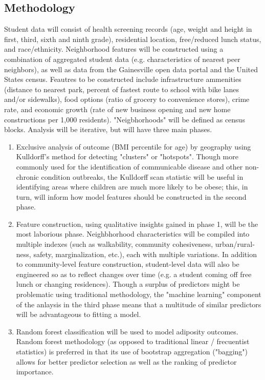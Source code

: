 \documentclass[11pt]{article}
\begin{document}
\subsection*{Methodology}
Student data will consist of health screening records (age, weight and height in first, third, sixth and ninth grade), residential location, free/reduced lunch status, and race/ethnicity.  Neighborhood features will be constructed using a combination of aggregated student data (e.g. characteristics of nearest peer neighbors), as well as data from the Gainesville open data portal and the United States census.  Feautres to be constructed include infrastructure ammenities (distance to nearest park, percent of fastest route to school with bike lanes and/or sidewalks), food options (ratio of grocery to convenience stores), crime rate, and economic growth (rate of new business opening and new home constructions per 1,000 residents).  "Neigbhorhoods" will be defined as census blocks. Analysis will be iterative, but will have three main phases.
\begin{enumerate}
\item Exclusive analysis of outcome (BMI percentile for age) by geography using Kulldorff's method for detecting "clusters" or "hotspots".\cite{Kulldorff1997} Though more commonly used for the identification of communicable disease and other non-chronic condition outbreaks, the Kulldorff scan statistic will be useful in identifying areas where children are much more likely to be obese; this, in turn, will inform how model features should be constructed in the second phase.
\item Feature construction, using qualitative insights gained in phase 1, will be the most laborious phase. Neighbhorhood characteristics will be compiled into multiple indexes (such as walkability, community cohesiveness, urban/rural-ness, safety, marginalization, etc.), each with multiple variations. In addition to community-level feature construction, student-level data will also be engineered so as to reflect changes over time (e.g. a student coming off free lunch or changing residences). Though a surplus of predictors might be problematic using traditional methodology, the "machine learning" component of the anlaysis in the third phase means that a multitude of similar predictors will be advantageous to fitting a model. 
\item Random forest classification will be used to model adiposity outcomes.  Random forest methodology (as opposed to traditional linear / frecuentist statistics) is preferred in that its use of bootstrap aggregation ("bagging") allows for better predictor selection as well as the ranking of predictor importance.
\end{enumerate}
\end{document}
